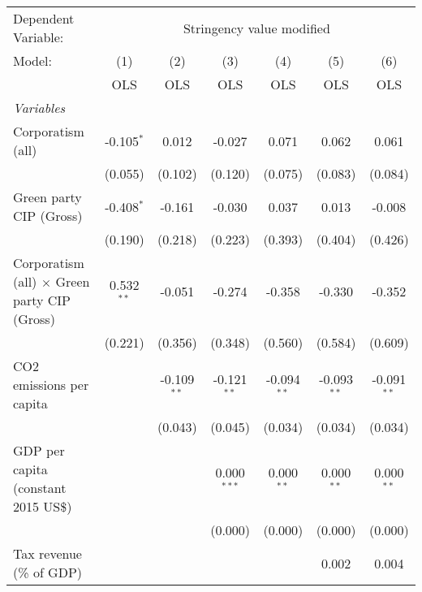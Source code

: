 
\begingroup
\centering
\begin{tabular}{lcccccc}
   \toprule
   Dependent Variable: & \multicolumn{6}{c}{Stringency value modified}\\
   Model:                                              & (1)          & (2)           & (3)           & (4)           & (5)           & (6)\\  
                                                       &  OLS         & OLS           & OLS           & OLS           & OLS           & OLS\\  
   \midrule
   \emph{Variables}\\
   Corporatism (all)                                   & -0.105$^{*}$ & 0.012         & -0.027        & 0.071         & 0.062         & 0.061\\   
                                                       & (0.055)      & (0.102)       & (0.120)       & (0.075)       & (0.083)       & (0.084)\\   
   Green party CIP (Gross)                             & -0.408$^{*}$ & -0.161        & -0.030        & 0.037         & 0.013         & -0.008\\   
                                                       & (0.190)      & (0.218)       & (0.223)       & (0.393)       & (0.404)       & (0.426)\\   
   Corporatism (all) $\times$ Green party CIP (Gross)  & 0.532$^{**}$ & -0.051        & -0.274        & -0.358        & -0.330        & -0.352\\   
                                                       & (0.221)      & (0.356)       & (0.348)       & (0.560)       & (0.584)       & (0.609)\\   
   CO2 emissions per capita                            &              & -0.109$^{**}$ & -0.121$^{**}$ & -0.094$^{**}$ & -0.093$^{**}$ & -0.091$^{**}$\\   
                                                       &              & (0.043)       & (0.045)       & (0.034)       & (0.034)       & (0.034)\\   
   GDP per capita (constant 2015 US\$)                 &              &               & 0.000$^{***}$ & 0.000$^{**}$  & 0.000$^{**}$  & 0.000$^{**}$\\   
                                                       &              &               & (0.000)       & (0.000)       & (0.000)       & (0.000)\\   
   Tax revenue (\% of GDP)                             &              &               &               &               & 0.002         & 0.004\\   

\end{tabular}
